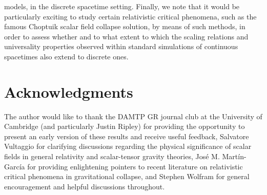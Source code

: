 \documentclass{article}
\begin{document}
models\cite{zeldovitch}, in the discrete spacetime setting. Finally, we note that it would be particularly exciting to study certain relativistic critical phenomena, such as the famous Choptuik scalar field collapse solution\cite{choptuik}, by means of such methods, in order to assess whether and to what extent to which the scaling relations and universality properties observed within standard simulations of continuous spacetimes\cite{gundlach2} also extend to discrete ones.

\section*{Acknowledgments}

The author would like to thank the DAMTP GR journal club at the University of Cambridge (and particularly Justin Ripley) for providing the opportunity to present an early version of these results and receive useful feedback, Salvatore Vultaggio for clarifying discussions regarding the physical significance of scalar fields in general relativity and scalar-tensor gravity theories, Jos\'e M. Mart\'in-Garc\'ia for providing enlightening pointers to recent literature on relativistic critical phenomena in gravitational collapse, and Stephen Wolfram for general encouragement and helpful discussions throughout.
\end{document}
